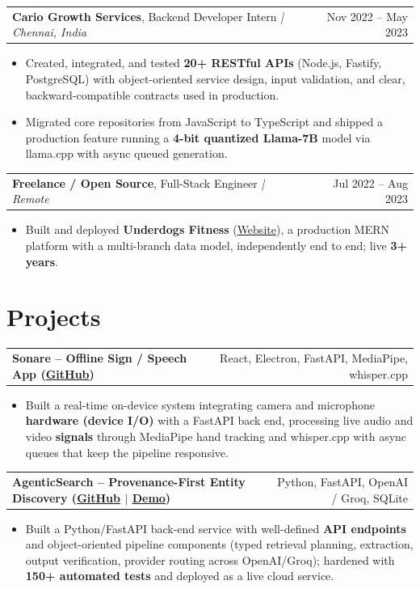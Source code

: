 \documentclass[letterpaper,11pt]{article}
\makeatletter
\newcommand{\expItem}[4]{%
  \vspace{3pt}
  \begin{tabular*}{\textwidth}{@{}l@{\extracolsep{\fill}}r@{}}
    \textbf{#1}, #2 \textit{| #3} & #4 \\
  \end{tabular*}\par\vspace{-2pt}
}
\newcommand{\projItem}[2]{%
  \vspace{6pt}
  \begin{tabular*}{\textwidth}{@{}l@{\extracolsep{\fill}}r@{}}
    \textbf{#1} & #2 \\
  \end{tabular*}\par\vspace{-2pt}
}
\makeatother
\begin{document}
\expItem{Cario Growth Services}{Backend Developer Intern}{Chennai, India}{Nov 2022 -- May 2023}
\begin{itemize}
  \item Created, integrated, and tested \textbf{20+ RESTful APIs} (Node.js, Fastify, PostgreSQL) with object-oriented service design, input validation, and clear, backward-compatible contracts used in production.
  \item Migrated core repositories from JavaScript to TypeScript and shipped a production feature running a \textbf{4-bit quantized Llama-7B} model via llama.cpp with async queued generation.
\end{itemize}

\expItem{Freelance / Open Source}{Full-Stack Engineer}{Remote}{Jul 2022 -- Aug 2023}
\begin{itemize}
  \item Built and deployed \textbf{Underdogs Fitness} (\href{https://www.underdogsfitness.in/}{Website}), a production MERN platform with a multi-branch data model, independently end to end; live \textbf{3+ years}.
\end{itemize}

\section{Projects}

\projItem{Sonare -- Offline Sign / Speech App {\normalfont\small(\href{https://github.com/Deva-1903/Qualcomm-Sep25-Team-Sonare}{GitHub})}}{React, Electron, FastAPI, MediaPipe, whisper.cpp}
\begin{itemize}
  \item Built a real-time on-device system integrating camera and microphone \textbf{hardware (device I/O)} with a FastAPI back end, processing live audio and video \textbf{signals} through MediaPipe hand tracking and whisper.cpp with async queues that keep the pipeline responsive.
\end{itemize}

\projItem{AgenticSearch -- Provenance-First Entity Discovery {\normalfont\small(\href{https://github.com/Deva-1903/ciir_agentic_search}{GitHub} $\vert$ \href{https://agentic-search-negglszkwa-uc.a.run.app}{Demo})}}{Python, FastAPI, OpenAI / Groq, SQLite}
\begin{itemize}
  \item Built a Python/FastAPI back-end service with well-defined \textbf{API endpoints} and object-oriented pipeline components (typed retrieval planning, extraction, output verification, provider routing across OpenAI/Groq); hardened with \textbf{150+ automated tests} and deployed as a live cloud service.
\end{itemize}
\end{document}
